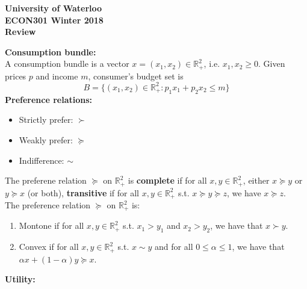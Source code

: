 \documentclass[12pt]{article}
\newcommand{\R}{\mathbb{R}^2_+}
\newcommand{\pref}{\succeq}
\begin{document}
\begin{center}
{\Large\bf University of Waterloo}\\
\vspace{3mm}
{\Large\bf ECON301 Winter 2018}\\
\vspace{3mm}
{\Large\bf Review}\\

\end{center}

\def\question#1{\item[\bf #1.]}
\def\part#1{\item[\bf #1)]}


\noindent
\textbf{Consumption bundle:}\\

\noindent
A consumption bundle is a vector $x = (x_1, x_2) \in \R$, i.e. $x_1, x_2 \geq 0$. Given prices $p$ and income $m$, consumer's budget set is
	\[B = \{(x_1, x_2) \in \mathbb{R}^2_+: p_1x_1 + p_2x_2 \leq m \}\]
\noindent
\textbf{Preference relations:}
\begin{itemize}
	\item Strictly prefer: $\succ$
	\item Weakly prefer: $\succeq$
	\item Indifference: $\sim$
\end{itemize}
The preferene relation $\succeq$ on $\mathbb{R}^2_+$ is \textbf{complete} if for all $x, y\in \mathbb{R}^2_+$, either $x \succeq y$ or $y \succeq x$ (or both), \textbf{transitive} if for all $x, y\in \mathbb{R}^2_+$ s.t. $x\succeq y \succeq z$, we have $x \succeq z$. \\

\noindent
The preference relation $\pref$ on $\R$ is:
\begin{enumerate}
	\item Montone if for all $x, y \in \R$ s.t. $x_1 > y_1$ and $x_2 > y_2$, we have that $x \succ y$.
	\item Convex if for all $x, y \in \R$ s.t. $x \sim y$ and for all $0 \leq \alpha \leq 1$, we have that\\ $\alpha x + (1-\alpha)y \pref x$.
\end{enumerate} 

\noindent
\textbf{Utility:}\\
\end{document}
